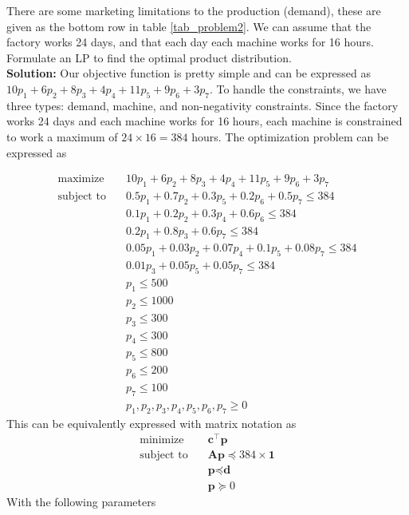 \documentclass[11pt]{article}
\begin{document}
There are some marketing limitations to the production (demand), these are given as the bottom row in table \ref{tab_problem2}.
We can assume that the factory works 24 days, and that each day each machine works for
16 hours.
Formulate an LP to find the optimal product distribution.
\\
\textbf{Solution: }
Our objective function is pretty simple and can be expressed as $10 p_1 + 6 p_2 + 8 p_3 + 4 p_4 + 11 p_5 + 9 p_6 + 3 p_7$.
To handle the constraints, we have three types: demand, machine, and non-negativity constraints.
Since the factory works 24 days and each machine works for 16 hours, each machine is constrained to work a maximum of $24 \times 16 = 384$ hours.
The optimization problem can be expressed as

\begin{align*}
  \text{maximize} & \quad 10 p_1 + 6 p_2 + 8 p_3 + 4 p_4 + 11 p_5 + 9 p_6 + 3 p_7 \\
  \text{subject to} & \quad 0.5 p_1 + 0.7 p_2 + 0.3 p_5 + 0.2 p_6 + 0.5 p_7 \leq 384 \\
  & \quad 0.1 p_1 + 0.2 p_2 + 0.3 p_4 + 0.6 p_6 \leq 384 \\
  & \quad 0.2 p_1 + 0.8 p_3 + 0.6 p_7 \leq 384 \\
  & \quad 0.05 p_1 + 0.03 p_2 + 0.07 p_4 + 0.1 p_5 + 0.08 p_7 \leq 384 \\
  & \quad 0.01 p_3 + 0.05 p_5 + 0.05 p_7 \leq 384 \\
  & \quad p_1 \leq 500 \\
  & \quad p_2 \leq 1000 \\
  & \quad p_3 \leq 300 \\
  & \quad p_4 \leq 300 \\
  & \quad p_5 \leq 800 \\
  & \quad p_6 \leq 200 \\
  & \quad p_7 \leq 100 \\
  & \quad p_1, p_2, p_3, p_4, p_5, p_6, p_7 \geq 0
\end{align*}
This can be equivalently expressed with matrix notation as 
\begin{align*}
  \text{minimize} & \quad \textbf{c}^\top \textbf{p} \\
  \text{subject to} & \quad \textbf{A} \textbf{p} \preceq 384 \times \textbf{1} \\
  & \quad \textbf{p} \preceq \textbf{d} \\
  & \quad \textbf{p} \succeq 0
\end{align*}
With the following parameters
\end{document}
